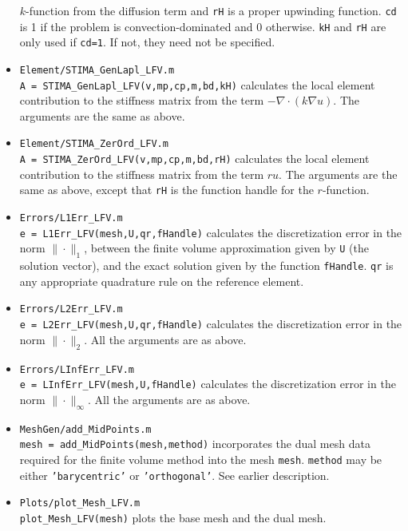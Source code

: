 \documentclass[a4paper,10pt]{article}
\begin{document}
\begin{itemize}
    $k$-function from the diffusion term and {\tt rH} is a proper upwinding
    function. {\tt cd} is 1 if the problem is convection-dominated and 0
    otherwise. {\tt kH} and {\tt rH} are only used if {\tt cd=1}. If not,
    they need not be specified.
\item {\tt Element/STIMA\_GenLapl\_LFV.m} \\
    {\tt A = STIMA\_GenLapl\_LFV(v,mp,cp,m,bd,kH)} calculates the local
    element contribution to the stiffness matrix from the term
    $-\nabla\cdot(k\nabla u)$. The arguments are the same as above.
\item {\tt Element/STIMA\_ZerOrd\_LFV.m} \\
    {\tt A = STIMA\_ZerOrd\_LFV(v,mp,cp,m,bd,rH)} calculates the local
    element contribution to the stiffness matrix from the term
    $ru$. The arguments are the same as above, except that {\tt rH} is
    the function handle for the $r$-function.
\item {\tt Errors/L1Err\_LFV.m} \\
    {\tt e = L1Err\_LFV(mesh,U,qr,fHandle)} calculates the discretization
    error in the norm $\|\cdot\|_1$, between the finite volume approximation
    given by {\tt U} (the solution vector), and the exact solution given by
    the function {\tt fHandle}. {\tt qr} is any appropriate quadrature rule
    on the reference element.
\item {\tt Errors/L2Err\_LFV.m} \\
    {\tt e = L2Err\_LFV(mesh,U,qr,fHandle)} calculates the discretization
    error in the norm $\|\cdot\|_2$. All the arguments are as above.
\item {\tt Errors/LInfErr\_LFV.m} \\
    {\tt e = LInfErr\_LFV(mesh,U,fHandle)} calculates the discretization
    error in the norm $\|\cdot\|_\infty$. All the arguments are as above.
\item {\tt MeshGen/add\_MidPoints.m} \\
    {\tt mesh = add\_MidPoints(mesh,method)} incorporates the dual mesh
    data required for the finite volume method into the mesh {\tt mesh}.
    {\tt method} may be either {\tt 'barycentric'} or {\tt 'orthogonal'}.
    See earlier description.
\item {\tt Plots/plot\_Mesh\_LFV.m} \\
    {\tt plot\_Mesh\_LFV(mesh)} plots the base mesh and the dual mesh.
\end{itemize}
\end{document}
